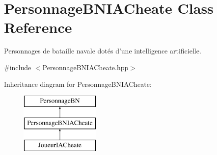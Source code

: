 \hypertarget{classPersonnageBNIACheate}{\section{Personnage\-B\-N\-I\-A\-Cheate Class Reference}
\label{classPersonnageBNIACheate}
}


Personnages de bataille navale dotés d'une intelligence artificielle.  




{\ttfamily \#include $<$Personnage\-B\-N\-I\-A\-Cheate.\-hpp$>$}

Inheritance diagram for Personnage\-B\-N\-I\-A\-Cheate\-:\begin{figure}[H]
\begin{center}
\leavevmode
\includegraphics[height=3.000000cm]{classPersonnageBNIACheate}
\end{center}
\end{figure}
